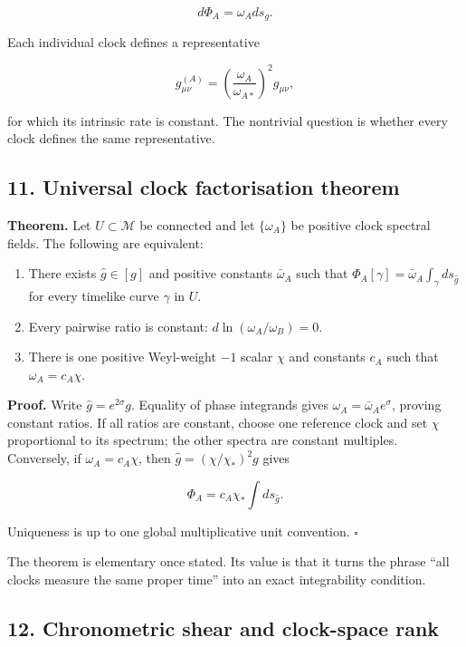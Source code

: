 \documentclass[
]{article}
\providecommand{\tightlist}{%
  \setlength{\itemsep}{0pt}\setlength{\parskip}{0pt}}
\begin{document}
\[
d\Phi_A=\omega_A ds_g.
\]

Each individual clock defines a representative

\[
g^{(A)}_{\mu\nu}
=\left(\frac{\omega_A}{\omega_{A*}}\right)^2g_{\mu\nu},
\]

for which its intrinsic rate is constant. The nontrivial question is
whether every clock defines the same representative.

\subsection{11. Universal clock factorisation
theorem}\label{universal-clock-factorisation-theorem}

\textbf{Theorem.} Let \(U\subset\mathcal M\) be connected and let
\(\{\omega_A\}\) be positive clock spectral fields. The following are
equivalent:

\begin{enumerate}
\def\labelenumi{\arabic{enumi}.}
\tightlist
\item
  There exists \(\widehat g\in[g]\) and positive constants
  \(\bar\omega_A\) such that
  \(\Phi_A[\gamma]=\bar\omega_A\int_\gamma ds_{\widehat g}\) for every
  timelike curve \(\gamma\) in \(U\).
\item
  Every pairwise ratio is constant: \(d\ln(\omega_A/\omega_B)=0\).
\item
  There is one positive Weyl-weight \(-1\) scalar \(\chi\) and constants
  \(c_A\) such that \(\omega_A=c_A\chi\).
\end{enumerate}

\textbf{Proof.} Write \(\widehat g=e^{2\sigma}g\). Equality of phase
integrands gives \(\omega_A=\bar\omega_Ae^\sigma\), proving constant
ratios. If all ratios are constant, choose one reference clock and set
\(\chi\) proportional to its spectrum; the other spectra are constant
multiples. Conversely, if \(\omega_A=c_A\chi\), then
\(\widehat g=(\chi/\chi_*)^2g\) gives

\[
\Phi_A=c_A\chi_*\int ds_{\widehat g}.
\]

Uniqueness is up to one global multiplicative unit convention.
\(\square\)

The theorem is elementary once stated. Its value is that it turns the
phrase ``all clocks measure the same proper time'' into an exact
integrability condition.

\subsection{12. Chronometric shear and clock-space
rank}\label{chronometric-shear-and-clock-space-rank}
\end{document}
